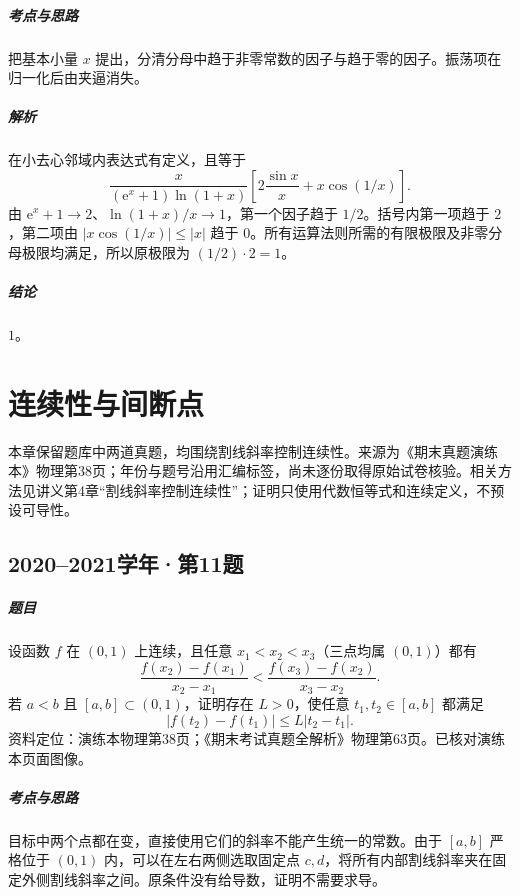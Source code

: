 \documentclass[UTF8,fontset=fandol,12pt,oneside,openany]{ctexrep}
\newcommand{\ee}{\mathrm e}
\theoremstyle{definition}
\begin{document}
\paragraph{考点与思路}把基本小量 $x$ 提出，分清分母中趋于非零常数的因子与趋于零的因子。振荡项在归一化后由夹逼消失。
\paragraph{解析}在小去心邻域内表达式有定义，且等于
\[
\frac{x}{(\ee^x+1)\ln(1+x)}
\left[2\frac{\sin x}{x}+x\cos(1/x)\right].
\]
由 $\ee^x+1\to2$、$\ln(1+x)/x\to1$，第一个因子趋于 $1/2$。括号内第一项趋于 $2$，第二项由
$|x\cos(1/x)|\le|x|$ 趋于 $0$。所有运算法则所需的有限极限及非零分母极限均满足，所以原极限为 $(1/2)\cdot2=1$。
\paragraph{结论}$\boxed{1}$。


\chapter{连续性与间断点}
\label{exam:04:chapter}

本章保留题库中两道真题，均围绕割线斜率控制连续性。来源为《期末真题演练本》物理第38页；年份与题号沿用汇编标签，尚未逐份取得原始试卷核验。相关方法见讲义第4章“割线斜率控制连续性”；证明只使用代数恒等式和连续定义，不预设可导性。

\par\addvspace{18pt}\noindent\begin{minipage}{\linewidth}
\section{2020--2021学年·第11题}
\paragraph{题目}
设函数 $f$ 在 $(0,1)$ 上连续，且任意 $x_1<x_2<x_3$（三点均属 $(0,1)$）都有
\[
 \frac{f(x_2)-f(x_1)}{x_2-x_1}
 <\frac{f(x_3)-f(x_2)}{x_3-x_2}.
\]
若 $a<b$ 且 $[a,b]\subset(0,1)$，证明存在 $L>0$，使任意 $t_1,t_2\in[a,b]$ 都满足
\[
 |f(t_2)-f(t_1)|\le L|t_2-t_1|.
\]
资料定位：演练本物理第38页；《期末考试真题全解析》物理第63页。已核对演练本页面图像。
\end{minipage}\par
\paragraph{考点与思路}
目标中两个点都在变，直接使用它们的斜率不能产生统一的常数。由于 $[a,b]$ 严格位于 $(0,1)$ 内，可以在左右两侧选取固定点 $c,d$，将所有内部割线斜率夹在固定外侧割线斜率之间。原条件没有给导数，证明不需要求导。
\end{document}
